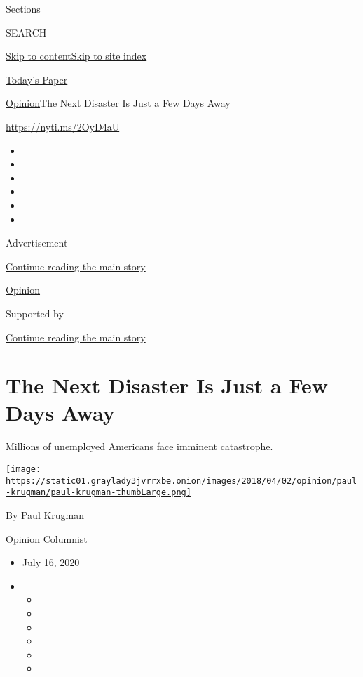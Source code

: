 Sections

SEARCH

\protect\hyperlink{site-content}{Skip to
content}\protect\hyperlink{site-index}{Skip to site index}

\href{https://myaccount.nytimes3xbfgragh.onion/auth/login?response_type=cookie\&client_id=vi}{}

\href{https://www.nytimes3xbfgragh.onion/section/todayspaper}{Today's
Paper}

\href{/section/opinion}{Opinion}\textbar{}The Next Disaster Is Just a
Few Days Away

\url{https://nyti.ms/2OyD4aU}

\begin{itemize}
\item
\item
\item
\item
\item
\item
\end{itemize}

Advertisement

\protect\hyperlink{after-top}{Continue reading the main story}

\href{/section/opinion}{Opinion}

Supported by

\protect\hyperlink{after-sponsor}{Continue reading the main story}

\hypertarget{the-next-disaster-is-just-a-few-days-away}{%
\section{The Next Disaster Is Just a Few Days
Away}\label{the-next-disaster-is-just-a-few-days-away}}

Millions of unemployed Americans face imminent catastrophe.

\href{https://www.nytimes3xbfgragh.onion/by/paul-krugman}{\texttt{[image: https://static01.graylady3jvrrxbe.onion/images/2018/04/02/opinion/paul-krugman/paul-krugman-thumbLarge.png]}}

By \href{https://www.nytimes3xbfgragh.onion/by/paul-krugman}{Paul
Krugman}

Opinion Columnist

\begin{itemize}
\item
  July 16, 2020
\item
  \begin{itemize}
  \item
  \item
  \item
  \item
  \item
  \item
  \end{itemize}
\end{itemize}

